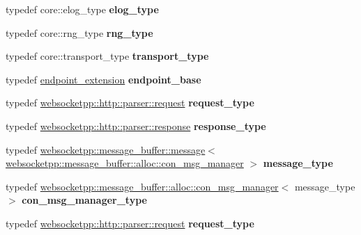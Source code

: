 \begin{DoxyCompactItemize}
typedef core\+::elog\+\_\+type {\bfseries elog\+\_\+type}
\item 
\mbox{\label{structstub__config_ab451127820621a9c8acf60b8f8ce62b8}} 
typedef core\+::rng\+\_\+type {\bfseries rng\+\_\+type}
\item 
\mbox{\label{structstub__config_aaada21529a6fe3cb91d8621b4b6f77ff}} 
typedef core\+::transport\+\_\+type {\bfseries transport\+\_\+type}
\item 
\mbox{\label{structstub__config_ad3a796f835108e68c135f7a658e6e847}} 
typedef \mbox{\hyperlink{structendpoint__extension}{endpoint\+\_\+extension}} {\bfseries endpoint\+\_\+base}
\item 
\mbox{\label{structstub__config_a7d7d444e1d7b2882bf22746be5c25f37}} 
typedef \mbox{\hyperlink{classwebsocketpp_1_1http_1_1parser_1_1request}{websocketpp\+::http\+::parser\+::request}} {\bfseries request\+\_\+type}
\item 
\mbox{\label{structstub__config_af1ff5c46d4fc72bce3b5fb9f6090f4d6}} 
typedef \mbox{\hyperlink{classwebsocketpp_1_1http_1_1parser_1_1response}{websocketpp\+::http\+::parser\+::response}} {\bfseries response\+\_\+type}
\item 
\mbox{\label{structstub__config_a251ee9935f06ff126dbdcae6af183493}} 
typedef \mbox{\hyperlink{classwebsocketpp_1_1message__buffer_1_1message}{websocketpp\+::message\+\_\+buffer\+::message}}$<$ \mbox{\hyperlink{classwebsocketpp_1_1message__buffer_1_1alloc_1_1con__msg__manager}{websocketpp\+::message\+\_\+buffer\+::alloc\+::con\+\_\+msg\+\_\+manager}} $>$ {\bfseries message\+\_\+type}
\item 
\mbox{\label{structstub__config_a590413e515623cd51f1cd6c0f72f1018}} 
typedef \mbox{\hyperlink{classwebsocketpp_1_1message__buffer_1_1alloc_1_1con__msg__manager}{websocketpp\+::message\+\_\+buffer\+::alloc\+::con\+\_\+msg\+\_\+manager}}$<$ message\+\_\+type $>$ {\bfseries con\+\_\+msg\+\_\+manager\+\_\+type}
\item 
\mbox{\label{structstub__config_a7d7d444e1d7b2882bf22746be5c25f37}} 
typedef \mbox{\hyperlink{classwebsocketpp_1_1http_1_1parser_1_1request}{websocketpp\+::http\+::parser\+::request}} {\bfseries request\+\_\+type}

\end{DoxyCompactItemize}
